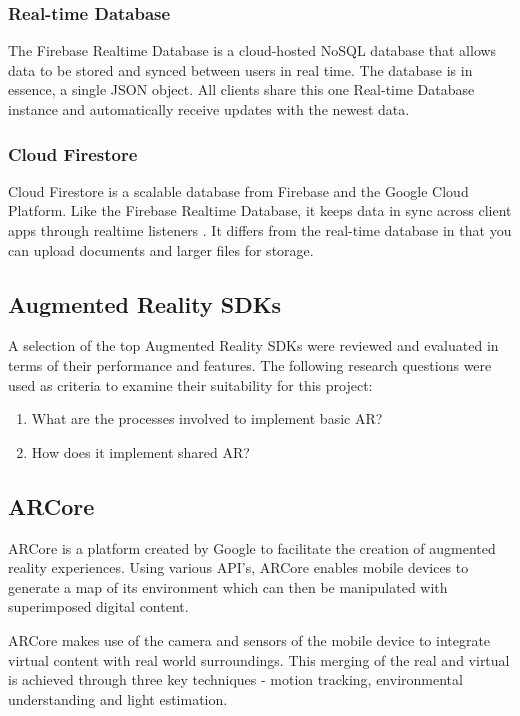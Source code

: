  \subsubsection{ Real-time Database}
The Firebase Realtime Database is a cloud-hosted NoSQL database that allows data to be stored and synced between users in real time\cite{firebase_realtime}. The database is in essence, a single JSON object. All clients share this one Real-time Database instance and automatically receive updates with the newest data.

 \subsubsection{Cloud Firestore}
Cloud Firestore is a scalable database from Firebase and  the Google Cloud Platform. Like the Firebase Realtime Database, it keeps data in sync across client apps through realtime listeners . It differs from the  real-time database in that you can upload documents and larger files for storage.

\subsection{Augmented Reality SDKs}
A selection of the top Augmented Reality SDKs were reviewed and evaluated in terms of their performance and features. The following research questions were used as criteria to examine their suitability for this project:

\begin{enumerate}
  \item What are the processes involved to implement basic AR?
\item How does it implement shared AR?

\end{enumerate}

\subsection{ARCore}

ARCore is a platform created by Google to facilitate the creation of augmented reality experiences. Using various API’s, ARCore enables mobile devices to generate a map of its environment which can then be manipulated with superimposed digital content.

ARCore makes use of the camera and sensors of the mobile device to integrate virtual content with real world surroundings. This merging of the real and virtual is achieved through three key techniques - motion tracking, environmental understanding and light estimation.




